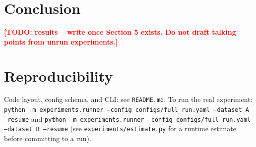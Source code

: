 \documentclass[11pt]{article}
\newcommand{\todoresults}[1]{\textcolor{red}{\textbf{[TODO: results -- #1]}}}
\begin{document}
\section{Conclusion}
\todoresults{write once Section 5 exists. Do not draft talking points from unrun experiments.}

\appendix
\section{Reproducibility}
Code layout, config schema, and CLI: see \texttt{README.md}. To run the real experiment:
\texttt{python -m experiments.runner --config configs/full\_run.yaml --dataset A --resume} and
\texttt{python -m experiments.runner --config configs/full\_run.yaml --dataset B --resume} (see
\texttt{experiments/estimate.py} for a runtime estimate before committing to a run).

\end{document}
